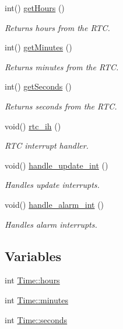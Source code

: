 \begin{DoxyCompactItemize}
int() \hyperlink{group__rtc_ga51db428cbafeba59111359b236ed248a}{get\+Hours} ()
\begin{DoxyCompactList}\small\item\em Returns hours from the R\+TC. \end{DoxyCompactList}\item 
int() \hyperlink{group__rtc_gad64e3c6015d2b7c99c50817798309d52}{get\+Minutes} ()
\begin{DoxyCompactList}\small\item\em Returns minutes from the R\+TC. \end{DoxyCompactList}\item 
int() \hyperlink{group__rtc_ga03144495c6cd7841203162b527998b53}{get\+Seconds} ()
\begin{DoxyCompactList}\small\item\em Returns seconds from the R\+TC. \end{DoxyCompactList}\item 
void() \hyperlink{group__rtc_ga0b9ae809cf571f61e54712a23c65348e}{rtc\+\_\+ih} ()
\begin{DoxyCompactList}\small\item\em R\+TC interrupt handler. \end{DoxyCompactList}\item 
void() \hyperlink{group__rtc_ga9f92f313c3714cb364715862d8737cd4}{handle\+\_\+update\+\_\+int} ()
\begin{DoxyCompactList}\small\item\em Handles update interrupts. \end{DoxyCompactList}\item 
void() \hyperlink{group__rtc_ga3cda919fc58bfbb8b4d08c54954d8fec}{handle\+\_\+alarm\+\_\+int} ()
\begin{DoxyCompactList}\small\item\em Handles alarm interrupts. \end{DoxyCompactList}\end{DoxyCompactItemize}
\subsection*{Variables}
\begin{DoxyCompactItemize}
\item 
int \hyperlink{group__rtc_gaa207ff7d820b4c32f22e1474a931b195}{Time\+::hours}
\item 
int \hyperlink{group__rtc_gacdca8b13b904057dfec90b68f3092bc4}{Time\+::minutes}
\item 
int \hyperlink{group__rtc_ga4eda0725cd2272762ceae3336ca07db6}{Time\+::seconds}
\end{DoxyCompactItemize}


